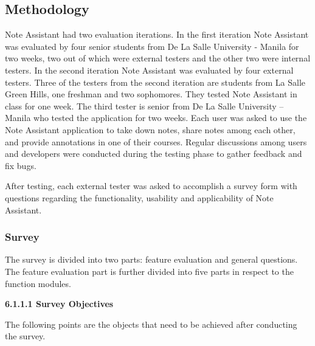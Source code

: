 %
%
%                 


\label{sec:resultsandobservations}    %

\subsection{Methodology}
\label{sec:methodology}

Note Assistant had two evaluation iterations. In the first iteration Note Assistant was evaluated by four senior students from De La Salle University - Manila for two weeks, two out of which were external testers and the other two were internal testers. In the second iteration Note Assistant was evaluated by four external testers. Three of the testers from the second iteration are students from La Salle Green Hills, one freshman and two sophomores. They tested Note Assistant in class for one week. The third tester is senior from De La Salle University – Manila who tested the application for two weeks. Each user was asked to use the Note Assistant application to take down notes, share notes among each other, and provide annotations in one of their courses. Regular discussions among users and developers were conducted during the testing phase to gather feedback and fix bugs.

After testing, each external tester was asked to accomplish a survey form with questions regarding the functionality, usability and applicability of Note Assistant.  

\subsubsection{Survey}

The survey is divided into two parts: feature evaluation and general questions. The feature evaluation part is further divided into five parts in respect to the function modules.

\begin{flushleft}
\textbf{6.1.1.1 Survey Objectives}
\end{flushleft}

\begin{raggedright}
The following points are the objects that need to be achieved after conducting the survey.
\end{raggedright}

